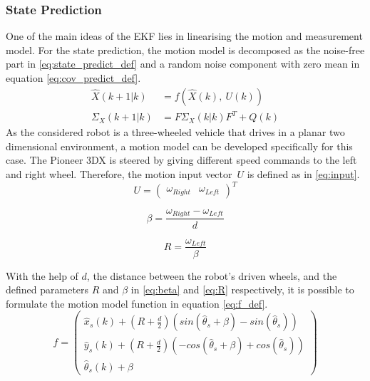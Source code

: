 \subsubsection{State Prediction}
\label{subsubsec:State_Prediction}
One of the main ideas of the EKF lies in linearising the motion and measurement model.
For the state prediction, the motion model is decomposed as the noise-free part in  \eqref{eq:state_predict_def} and a random noise component with zero mean in equation \eqref{eq:cov_predict_def}.
\begin{align}
\hat{X}(k+1|k) &= f(\hat{X}(k),~U(k)) \label{eq:state_predict_def} \\
\Sigma_{X}(k+1|k) &= F \Sigma_{X}(k|k) F^{T} + Q(k) \label{eq:cov_predict_def} 
\end{align}
As the considered robot is a three-wheeled vehicle that drives in a planar two dimensional environment, a motion model can be developed specifically for this case. The Pioneer 3DX is steered by giving different speed commands to the left and right wheel. Therefore, the motion input \mbox{vector $U$} is defined as in \eqref{eq:input}.
\begin{equation}
U=\begin{pmatrix}\omega_{Right} & \omega_{Left} \end{pmatrix}^T \label{eq:input}
\end{equation}
\noindent\begin{minipage}{.53\linewidth}
\centering
\begin{equation}
\beta=\frac{\omega_{Right}-\omega_{Left}}{d} \label{eq:beta}
\end{equation}
\end{minipage}%
\begin{minipage}{.38\linewidth}
\centering
\begin{equation}
R=\frac{\omega_{Left}}{\beta} \label{eq:R}
\end{equation}
\end{minipage}

\medskip

With the help of $d$, the distance between the robot's driven wheels, and the defined parameters $R$ and $\beta$ in \eqref{eq:beta} and \eqref{eq:R} respectively, it is possible to formulate the motion model function in equation \eqref{eq:f_def}.
\begin{equation}
f = \begin{pmatrix} \hat{x}_s(k) + (R+\frac{d}{2})(sin(\hat{\theta}_s+ \beta)-sin(\hat{\theta}_s)) \\ \hat{y}_s(k) + (R+{\frac{d}{2}})(-cos(\hat{\theta}_s+ \beta)+cos(\hat{\theta}_s)) \\ \hat{\theta}_s(k) + \beta\end{pmatrix}
\label{eq:f_def}
\end{equation}

